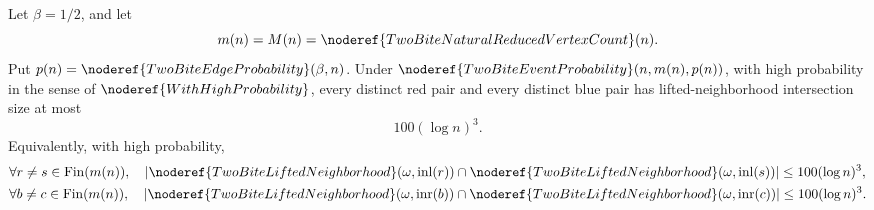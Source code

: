 \begin{helper}
Let \(\beta=1/2\), and let
\[
m(n)=M(n)=\noderef{TwoBiteNaturalReducedVertexCount}(n).
\]
Put \(p(n)=\noderef{TwoBiteEdgeProbability}(\beta,n)\).  Under
\(\noderef{TwoBiteEventProbability}(n,m(n),p(n))\), with high probability in
the sense of \(\noderef{WithHighProbability}\), every distinct red pair and
every distinct blue pair has lifted-neighborhood intersection size at most
\[
100(\log n)^3.
\]
Equivalently, with high probability,
\[
\begin{aligned}
&\forall r\ne s\in \operatorname{Fin}(m(n)),\quad
\left|
\noderef{TwoBiteLiftedNeighborhood}(\omega,\operatorname{inl}(r))
\cap
\noderef{TwoBiteLiftedNeighborhood}(\omega,\operatorname{inl}(s))
\right|
\le 100(\log n)^3,\\
&\forall b\ne c\in \operatorname{Fin}(m(n)),\quad
\left|
\noderef{TwoBiteLiftedNeighborhood}(\omega,\operatorname{inr}(b))
\cap
\noderef{TwoBiteLiftedNeighborhood}(\omega,\operatorname{inr}(c))
\right|
\le 100(\log n)^3 .
\end{aligned}
\]
\end{helper}
